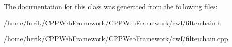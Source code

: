 The documentation for this class was generated from the following files\+:\begin{DoxyCompactItemize}
\item 
/home/herik/\+C\+P\+P\+Web\+Framework/\+C\+P\+P\+Web\+Framework/cwf/\hyperlink{filterchain_8h}{filterchain.\+h}\item 
/home/herik/\+C\+P\+P\+Web\+Framework/\+C\+P\+P\+Web\+Framework/cwf/\hyperlink{filterchain_8cpp}{filterchain.\+cpp}\end{DoxyCompactItemize}

